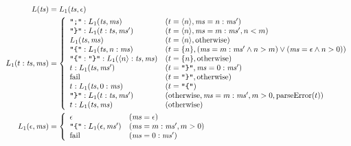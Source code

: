 \documentclass[12pt]{article}
\begin{document}
\pagestyle{empty}

\begin{align*}
    L(\mathit{ts}) &= L_1(\mathit{ts}, \epsilon) \\
    L_1(t:\mathit{ts}, \mathit{ms}) &= \left\{\begin{array}{ll}
        \texttt{\textquotedbl;\textquotedbl}:L_1(\mathit{ts}, \mathit{ms}) &(t = \langle n\rangle, \mathit{ms} = n:\mathit{ms}') \\
        \texttt{\textquotedbl\}\textquotedbl}:L_1(t:\mathit{ts}, \mathit{ms}') &(t = \langle n\rangle, \mathit{ms} = m:\mathit{ms}', n < m) \\
        L_1(\mathit{ts}, \mathit{ms}) &(t = \langle n\rangle, \text{otherwise}) \\
        \texttt{\textquotedbl\{\textquotedbl}:L_1(\mathit{ts}, n:\mathit{ms}) &(t = \{ n\}, (\mathit{ms} = m:\mathit{ms}' \land n > m) \lor (\mathit{ms} = \epsilon \land n > 0)) \\
        \texttt{\textquotedbl\{\textquotedbl}:\texttt{\textquotedbl\}\textquotedbl}:L_1(\langle n\rangle:\mathit{ts}, \mathit{ms}) &(t = \{ n\}, \text{otherwise}) \\
        t:L_1(\mathit{ts}, \mathit{ms}') &(t = \texttt{\textquotedbl\}\textquotedbl}, \mathit{ms} = 0:\mathit{ms}') \\
        \mathrm{fail} &(t = \texttt{\textquotedbl\}\textquotedbl}, \text{otherwise}) \\
        t:L_1(\mathit{ts}, 0:\mathit{ms}) &(t = \texttt{\textquotedbl\{\textquotedbl}) \\
        \texttt{\textquotedbl\}\textquotedbl}:L_1(t:\mathit{ts}, \mathit{ms}') &(\text{otherwise}, \mathit{ms} = m:\mathit{ms}', m > 0, \mathrm{parseError}(t)) \\
        t:L_1(\mathit{ts}, \mathit{ms}) &(\text{otherwise}) \\
    \end{array}\right. \\
    L_1(\epsilon, \mathit{ms}) &= \left\{\begin{array}{ll}
        \epsilon &(\mathit{ms} = \epsilon) \\
        \texttt{\textquotedbl\{\textquotedbl}:L_1(\epsilon, \mathit{ms}') &(\mathit{ms} = m:\mathit{ms}', m > 0) \\
        \mathrm{fail} &(\mathit{ms} = 0:\mathit{ms}')
    \end{array}\right.
\end{align*}
\end{document}
